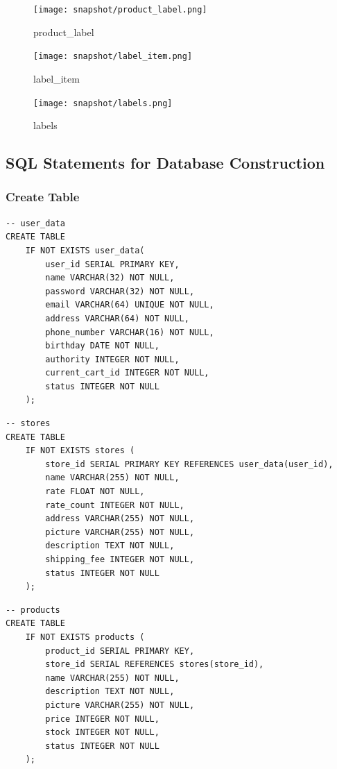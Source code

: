 \documentclass[a4paper, 12pt]{article}
\begin{document}
\begin{figure}[hp]
    \centerline{\texttt{[image: snapshot/product\_label.png]}}
    \caption{product_label}
\end{figure}

\begin{figure}[hp]
    \centerline{\texttt{[image: snapshot/label\_item.png]}}
    \caption{label_item}
\end{figure}

\clearpage

\begin{figure}[h!]
    \centerline{\texttt{[image: snapshot/labels.png]}}
    \caption{labels}
\end{figure}

\clearpage

\subsection{SQL Statements for Database Construction}
\subsubsection{Create Table}
\begin{lstlisting}
-- user_data
CREATE TABLE
    IF NOT EXISTS user_data(
        user_id SERIAL PRIMARY KEY,
        name VARCHAR(32) NOT NULL,
        password VARCHAR(32) NOT NULL,
        email VARCHAR(64) UNIQUE NOT NULL,
        address VARCHAR(64) NOT NULL,
        phone_number VARCHAR(16) NOT NULL,
        birthday DATE NOT NULL,
        authority INTEGER NOT NULL,
        current_cart_id INTEGER NOT NULL,
        status INTEGER NOT NULL
    );
\end{lstlisting}

\begin{lstlisting}
-- stores
CREATE TABLE
    IF NOT EXISTS stores (
        store_id SERIAL PRIMARY KEY REFERENCES user_data(user_id),
        name VARCHAR(255) NOT NULL,
        rate FLOAT NOT NULL,
        rate_count INTEGER NOT NULL,
        address VARCHAR(255) NOT NULL,
        picture VARCHAR(255) NOT NULL,
        description TEXT NOT NULL,
        shipping_fee INTEGER NOT NULL,
        status INTEGER NOT NULL
    );
\end{lstlisting}

\begin{lstlisting}
-- products
CREATE TABLE
    IF NOT EXISTS products (
        product_id SERIAL PRIMARY KEY,
        store_id SERIAL REFERENCES stores(store_id),
        name VARCHAR(255) NOT NULL,
        description TEXT NOT NULL,
        picture VARCHAR(255) NOT NULL,
        price INTEGER NOT NULL,
        stock INTEGER NOT NULL,
        status INTEGER NOT NULL
    );
\end{lstlisting}
\end{document}
